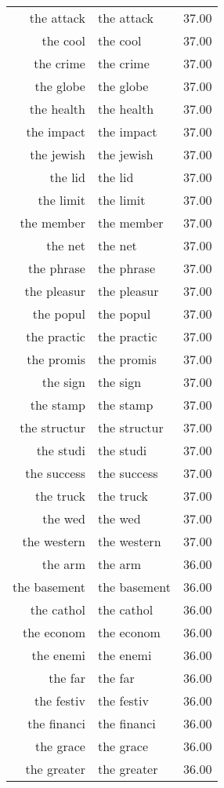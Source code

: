 \begin{table}[ht]
\begin{tabular}{rlr}
  the attack & the attack & 37.00 \\ 
  the cool & the cool & 37.00 \\ 
  the crime & the crime & 37.00 \\ 
  the globe & the globe & 37.00 \\ 
  the health & the health & 37.00 \\ 
  the impact & the impact & 37.00 \\ 
  the jewish & the jewish & 37.00 \\ 
  the lid & the lid & 37.00 \\ 
  the limit & the limit & 37.00 \\ 
  the member & the member & 37.00 \\ 
  the net & the net & 37.00 \\ 
  the phrase & the phrase & 37.00 \\ 
  the pleasur & the pleasur & 37.00 \\ 
  the popul & the popul & 37.00 \\ 
  the practic & the practic & 37.00 \\ 
  the promis & the promis & 37.00 \\ 
  the sign & the sign & 37.00 \\ 
  the stamp & the stamp & 37.00 \\ 
  the structur & the structur & 37.00 \\ 
  the studi & the studi & 37.00 \\ 
  the success & the success & 37.00 \\ 
  the truck & the truck & 37.00 \\ 
  the wed & the wed & 37.00 \\ 
  the western & the western & 37.00 \\ 
  the arm & the arm & 36.00 \\ 
  the basement & the basement & 36.00 \\ 
  the cathol & the cathol & 36.00 \\ 
  the econom & the econom & 36.00 \\ 
  the enemi & the enemi & 36.00 \\ 
  the far & the far & 36.00 \\ 
  the festiv & the festiv & 36.00 \\ 
  the financi & the financi & 36.00 \\ 
  the grace & the grace & 36.00 \\ 
  the greater & the greater & 36.00 \\ 

\end{tabular}
\end{table}
